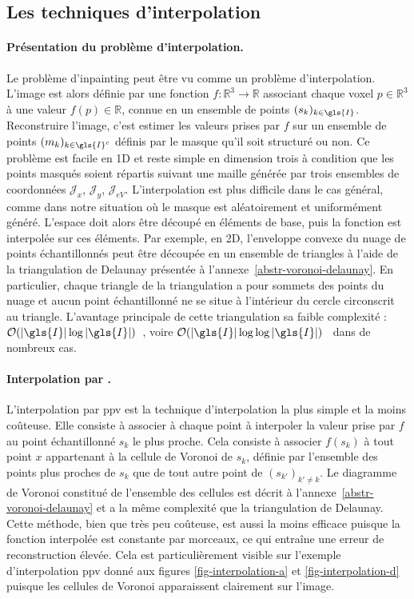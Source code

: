 \subsection{Les techniques d'interpolation}\label{sec-interpolation}

\paragraph{Présentation du problème d'interpolation.} Le problème d'inpainting peut être vu comme un problème d'interpolation. L'image est alors définie par une fonction $f:\mathbb{R}^3\rightarrow \mathbb{R}$ associant chaque voxel $p\in\mathbb{R}^3$ à une valeur $f(p)\in\mathbb{R}$, connue en un ensemble de points $(s_k)_{k\in\gls{I}}$. Reconstruire l'image, c'est estimer les valeurs prises par $f$ sur un ensemble de points $(m_k)_{k\in \gls{I}^c }$ définis par le masque qu'il soit structuré ou non. 
%
Ce problème est facile en 1D et reste simple en dimension trois à condition que les points masqués soient répartis suivant une maille générée par trois ensembles de coordonnées $\mathcal{J}_x$, $\mathcal{J}_y$, $\mathcal{J}_{eV}$. L'interpolation est plus difficile dans le cas général, comme dans notre situation où le masque est aléatoirement et uniformément généré. L'espace doit alors être découpé en éléments de base, puis la fonction est interpolée sur ces éléments. Par exemple, en 2D, l'enveloppe convexe du nuage de points échantillonnés peut être découpée en un ensemble de triangles à l'aide de la triangulation de Delaunay présentée à l'annexe~\ref{abstr-voronoi-delaunay}. En particulier, chaque triangle de la triangulation a pour sommets des points du nuage et aucun point échantillonné ne se situe à l'intérieur du cercle circonscrit au triangle. L'avantage principale de cette triangulation sa faible complexité : $\mathcal{O}(|\gls{I}|\log |\gls{I}|)$~\cite{lee1980two}, voire $\mathcal{O}(|\gls{I}|\log \log |\gls{I}|)$~\cite{dwyer1987faster} dans de nombreux cas.

\paragraph{Interpolation par .} L'interpolation par \gls{ppv} est la technique d'interpolation la plus simple et la moins coûteuse. Elle consiste à associer à chaque point à interpoler la valeur prise par $f$ au point échantillonné $s_{k}$ le plus proche. Cela consiste à associer $f(s_{k})$ à tout point $x$ appartenant à la cellule de Voronoi de $s_{k}$, définie par l'ensemble des points plus proches de $s_k$ que de tout autre point de $(s_{k'})_{k'\neq k}$. Le diagramme de Voronoi constitué de l'ensemble des cellules est décrit à l'annexe~\ref{abstr-voronoi-delaunay} et a la même complexité que la triangulation de Delaunay. Cette méthode, bien que très peu coûteuse, est aussi la moins efficace puisque la fonction interpolée est constante par morceaux, ce qui entraîne une erreur de reconstruction élevée. Cela est particulièrement visible sur l'exemple d'interpolation \gls{ppv} donné aux figures \ref{fig-interpolation-a} et \ref{fig-interpolation-d} puisque les cellules de Voronoi apparaissent clairement sur l'image.

